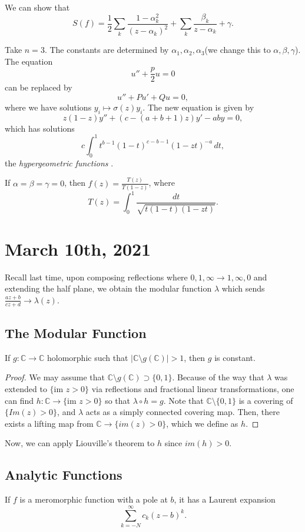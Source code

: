 \documentclass[12pt]{scrartcl}
\newcommand{\C}{\mathbb C}
\begin{document}
We can show that 
$$S(f) = \frac{1}{2} \sum_k \frac{1 - \alpha_k^2}{(z - \alpha_k)^2} + \sum_k\frac{\beta_k}{z - \alpha_k} + \gamma.  $$

Take $n = 3$.  The constants are determined by $\alpha_1, \alpha_2, \alpha_3$(we change this to $\alpha, \beta, \gamma$).  The equation $$u'' + \frac{p}{2}u = 0$$
can be replaced by $$u'' + Pu' + Qu = 0,$$
where we have solutions $y_i \mapsto \sigma(z) y_i$.  The new equation is given by
$$z(1-z) y'' + (c - (a + b + 1)z)y' - aby = 0,$$
which has solutions 
$$c\int_0^1 t^{b-1}(1- t)^{c - b- 1} (1 - zt)^{-a}\,dt,$$
the \textit{hypergeometric functions }.


\begin{proposition} If $\alpha = \beta = \gamma = 0$, then $f(z) = \frac{T(z)}{T(1-z)}$, where $$T(z) = \int_0^1 \frac{dt}{\sqrt{t(1-t)(1-zt)}}.$$
\end{proposition}
\pagebreak
\section{March 10th, 2021}
Recall last time, upon composing reflections where $0, 1, \infty \to 1, \infty, 0$ and extending the half plane, we obtain the modular function $\lambda$ which sends $\frac{az + b}{cz + d} \to \lambda(z)$.  
\subsection{The Modular Function}
\begin{theorem}[Picard] If $g: \C \to \C$ holomorphic such that $|\C \setminus g(\C)| > 1$, then $g$ is constant.  
\end{theorem}
\begin{proof}
We may assume that $\C \setminus g(\C) \supset \{0, 1\}$.  Because of the way that $\lambda$ was extended to $\{\text{im }z > 0\}$ via reflections and fractional linear transformations, one can find $h:\C \to \{\text{im }z > 0\}$ so that $\lambda \circ h = g$.  Note that $\C \setminus \{0, 1\}$ is a covering of $\{Im (z) > 0\}$, and $\lambda$ acts as a simply connected covering map.  Then, there exists a lifting map from $\C \to \{im(z) > 0\}$, which we define as $h$.
\end{proof}

Now, we can apply Liouville's theorem to $h$ since $im(h)>0$.  
\subsection{Analytic Functions}
If $f$ is a meromorphic function with a pole at $b$, it has a Laurent expansion
$$\sum_{k = -N}^\infty c_k(z - b)^k.$$
\end{document}
